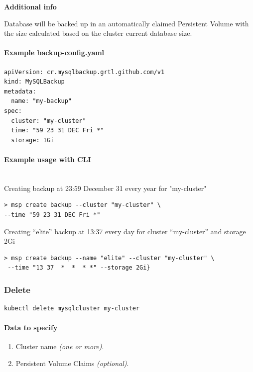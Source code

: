 \noindent  \textbf{Additional info}

\noindent Database will be backed up in an automatically claimed Persistent Volume with the size
calculated based on the cluster current database size.

\paragraph{Example \textbf{backup-config.yaml}}
\begin{lstlisting}[caption=backup-config.yaml,captionpos=b]
apiVersion: cr.mysqlbackup.grtl.github.com/v1
kind: MySQLBackup
metadata:
  name: "my-backup"
spec:
  cluster: "my-cluster"
  time: "59 23 31 DEC Fri *"
  storage: 1Gi
\end{lstlisting}

\paragraph{Example usage with CLI}\mbox{}\\

\noindent Creating backup at 23:59 December 31 every year for "my-cluster"

\begin{lstlisting}
> msp create backup --cluster "my-cluster" \
--time "59 23 31 DEC Fri *"
\end{lstlisting}

\noindent Creating “elite” backup  at 13:37 every day for cluster “my-cluster” and storage 2Gi

\begin{lstlisting}
> msp create backup --name "elite" --cluster "my-cluster" \
 --time "13 37  *  *  * *" --storage 2Gi}
 \end{lstlisting}

\subsubsection*{Delete}
\begin{lstlisting}
kubectl delete mysqlcluster my-cluster
\end{lstlisting}

\paragraph{Data to specify}
\begin{enumerate}
	\item Cluster name \textit{(one or more)}.
	\item Persistent Volume Claims \textit{(optional)}.
\end{enumerate}

